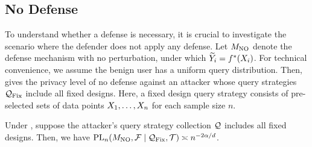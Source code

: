 

    \def\fixq{\textrm{Fix}}
    \subsection{No Defense}
    To understand whether a defense is necessary, it is crucial to investigate the scenario where the defender does not apply any defense.
    Let $M_{\textrm{NO}}$ denote the defense mechanism with no perturbation, under which $\widetilde{Y}_i=f^*(X_i)$. For technical convenience, we assume the benign user has a uniform query distribution. 
    Then,  gives the privacy level of no defense against an attacker whose query strategies $\qsc_{\fixq}$ include all fixed designs. Here, a fixed design query strategy consists of pre-selected sets of data points $X_1, \dots, X_n$ for each sample size $n$. 
    \begin{theorem} %
    \label{ex:atk_no}
       Under ,
        suppose the attacker's query strategy collection $\mathcal{Q}$ includes all fixed designs. Then, we have $\pl_n(\dno,\fc\mid \qsc_{\fixq},\lac) \asymp n^{-2\alpha/d}$. 
    \end{theorem}

